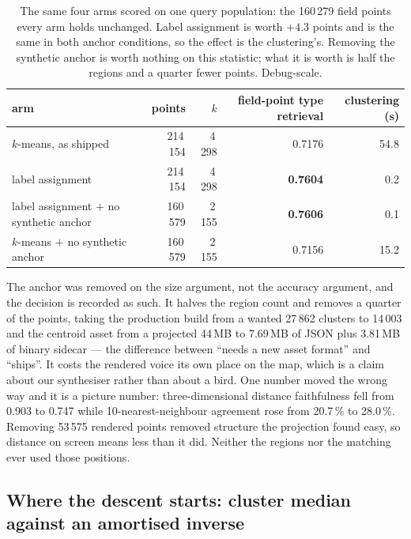 \documentclass[10pt,twocolumn,a4paper]{article}
\begin{document}
\begin{table}[t]
\centering
\small
\caption{The same four arms scored on one query population: the 160\,279 field points every
arm holds unchanged. Label assignment is worth $+4.3$ points and is the same in both anchor
conditions, so the effect is the clustering's. Removing the synthetic anchor is worth
nothing on this statistic; what it is worth is half the regions and a quarter fewer points.
Debug-scale.}
\label{tab:w5}
\begin{tabular}{L{6.6cm} r r r r}
\toprule
arm & points & $k$ & field-point type retrieval & clustering (s) \\
\midrule
$k$-means, as shipped & 214\,154 & 4\,298 & 0.7176 & 54.8 \\
label assignment & 214\,154 & 4\,298 & \textbf{0.7604} & 0.2 \\
label assignment $+$ no synthetic anchor & 160\,579 & 2\,155 & \textbf{0.7606} & 0.1 \\
$k$-means $+$ no synthetic anchor & 160\,579 & 2\,155 & 0.7156 & 15.2 \\
\bottomrule
\end{tabular}
\end{table}

The anchor was removed on the size argument, not the accuracy argument, and the decision is
recorded as such. It halves the region count and removes a quarter of the points, taking the
production build from a wanted 27\,862 clusters to 14\,003 and the centroid asset from a
projected 44\,MB to 7.69\,MB of JSON plus 3.81\,MB of binary sidecar --- the difference
between ``needs a new asset format'' and ``ships''. It costs the rendered voice its own
place on the map, which is a claim about our synthesiser rather than about a bird. One
number moved the wrong way and it is a picture number: three-dimensional distance
faithfulness fell from 0.903 to 0.747 while 10-nearest-neighbour agreement rose from
20.7\,\% to 28.0\,\%. Removing 53\,575 rendered points removed structure the projection found
easy, so distance on screen means less than it did. Neither the regions nor the matching
ever used those positions.

\subsection{Where the descent starts: cluster median against an amortised inverse}
\end{document}
